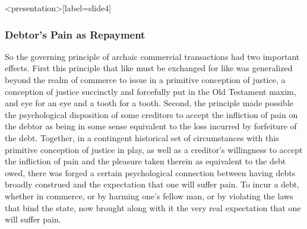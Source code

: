 \begin{frame}<presentation>[label=slide4]
    \frametitle{Debtor's Pain as Repayment}
\end{frame}

So the governing principle of archaic commercial transactions had two important effects. First this principle that like must be exchanged for like was generalized beyond the realm of commerce to issue in a primitive conception of justice, a conception of justice succinctly and forcefully put in the Old Testament maxim, and eye for an eye and a tooth for a tooth. Second, the principle made possible the psychological disposition of some creditors to accept the infliction of pain on the debtor as being in some sense equivalent to the loss incurred by forfeiture of the debt. Together, in a contingent historical set of circumstances with this primitive conception of justice in play, as well as a creditor's willingness to accept the infliction of pain and the pleasure taken therein as equivalent to the debt owed, there was forged a certain psychological connection between having debts broadly construed and the expectation that one will suffer pain. To incur a debt, whether in commerce, or by harming one's fellow man, or by violating the laws that bind the state, now brought along with it the very real expectation that one will suffer pain.

